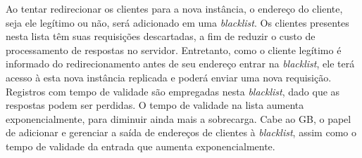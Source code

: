 Ao tentar redirecionar os clientes para a nova instância, o endereço do cliente, seja ele legítimo ou não, será adicionado em uma \emph{blacklist}. Os clientes presentes nesta lista têm suas requisições descartadas, a fim de reduzir o custo de processamento de respostas no servidor. Entretanto, como o cliente legítimo é informado do redirecionamento antes de seu endereço entrar na \emph{blacklist}, ele terá acesso à esta nova instância replicada e poderá enviar uma nova requisição. Registros com tempo de validade são empregadas nesta \emph{blacklist}, dado que as respostas podem ser perdidas. O tempo de validade na lista aumenta exponencialmente, para diminuir ainda mais a sobrecarga. Cabe ao GB, o papel de adicionar e gerenciar a saída de endereços de clientes à \emph{blacklist}, assim como o tempo de validade da entrada que aumenta exponencialmente.


% 
% 
